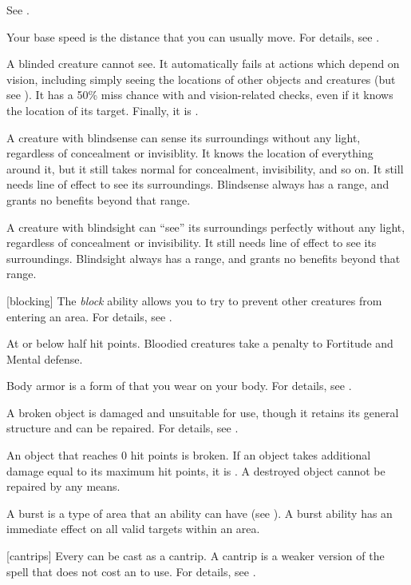  See .

 Your base speed is the distance that you can usually move.
For details, see .

 A blinded creature cannot see. It automatically fails at actions which depend on vision, including simply seeing the locations of other objects and creatures (but see ). It has a 50\% miss chance with  and vision-related checks, even if it knows the location of its target. Finally, it is .

 A creature with blindsense can sense its surroundings without any light, regardless of concealment or invisiblity.
It knows the location of everything around it, but it still takes normal  for concealment, invisibility, and so on.
It still needs line of effect to see its surroundings.
Blindsense always has a range, and grants no benefits beyond that range.

 A creature with blindsight can ``see'' its surroundings perfectly without any light, regardless of concealment or invisibility.
It still needs line of effect to see its surroundings.
Blindsight always has a range, and grants no benefits beyond that range.

[blocking] The \textit{block} ability allows you to try to prevent other creatures from entering an area.
For details, see .

 At or below half hit points. Bloodied creatures take a  penalty to Fortitude and Mental defense.

 Body armor is a form of  that you wear on your body.
For details, see .

 A broken object is damaged and unsuitable for use, though it retains its general structure and can be repaired.
For details, see .

An object that reaches 0 hit points is broken. If an object takes additional damage equal to its maximum hit points, it is . A destroyed object cannot be repaired by any means.

 A burst is a type of area that an ability can have (see ).
A burst ability has an immediate effect on all valid targets within an area.

[cantrips] Every  can be cast as a cantrip.
A cantrip is a weaker version of the spell that does not cost an  to use.
For details, see .

